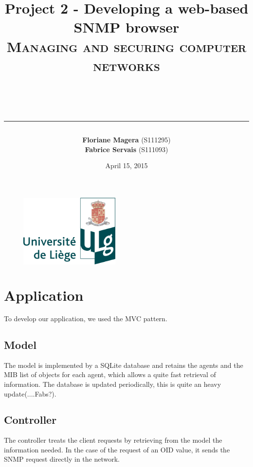 \documentclass[a4paper,titlepage]{article}
\begin{document}
\begin{titlepage}

\begin{figure}
\centering
\includegraphics[width=5cm]{logo-ulg.png}
\end{figure}



\title{
\vspace{0.2cm}
\LARGE{\textbf{Project 2 - Developing a web-based SNMP browser }} \\ \textsc{Managing and securing computer networks}
\author{\textbf{Floriane Magera} \small{(S111295})\\\textbf{Fabrice Servais} \small{(S111093})}\\
\date{April 15, 2015}
\rule{15cm}{1.5pt}
}

\end{titlepage}

\pagestyle{fancy}

\maketitle





\section{Application}
To develop our application, we used the MVC pattern.
\subsection{Model}
 The model is implemented by a SQLite database and retains the agents and the MIB list of objects for each agent, which allows a quite fast retrieval of information. The database is updated periodically, this is quite an heavy update(....Fabs?). 

\subsection{Controller}
The controller treats the client requests by retrieving from the model the information needed. In the case of the request of an OID value, it sends the SNMP request directly in the network.\\ \\
\end{document}
